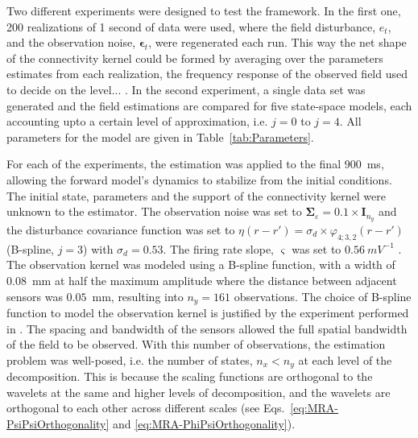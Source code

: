 \documentclass[review,authoryear,3p]{elsarticle}
\begin{document}
Two different experiments were designed to test the framework. In the first one, 200 realizations of 1 second of data were used, where the field disturbance, $e_t$, and the observation noise, $\boldsymbol\epsilon_t$, were regenerated each run. This way the net shape of the connectivity kernel could be formed by averaging over the parameters estimates from each realization, the frequency response of the observed field used to decide on the level... . In the second experiment, a single data set was generated and the field estimations are compared for five state-space models, each accounting upto a certain level of approximation, i.e. $j=0$ to $j=4$. All parameters for the model are given in Table~\ref{tab:Parameters}.

For each of the experiments, the estimation was applied to the final 900~ms, allowing the forward model's dynamics to stabilize from the initial conditions. The initial state, parameters and the support of the connectivity kernel were unknown to the estimator. The observation noise was set to $\boldsymbol\Sigma_{\varepsilon}=0.1 \times \mathbf{I}_{n_y}$ and the disturbance covariance function was set to $\eta(r-r') = \sigma_d\times\varphi_{4;3,2}(r-r')$ (B-spline, $j=3$) with $\sigma_d=0.53$.  The firing rate slope, $\varsigma$ was set to $0.56~mV^{-1}$ \citep{Wendling2005}. The observation kernel was modeled using a B-spline function, with a width of 0.08~mm at half the maximum amplitude where the distance between adjacent sensors was $0.05$~mm, resulting into $n_y = 161$ observations. The choice of B-spline function to model the observation kernel is justified by the experiment performed in \citep{Freestone2011}. The spacing and bandwidth of the sensors allowed the full spatial bandwidth of the field to be observed.  With this number of observations, the estimation problem was well-posed, i.e. the number of states, $n_x < n_y$ at each level of the decomposition. This is because the scaling functions are orthogonal to the wavelets at the same and higher levels of decomposition, and  the wavelets are orthogonal to each other across different scales (see Eqs.~\eqref{eq:MRA-PsiPsiOrthogonality} and \eqref{eq:MRA-PhiPsiOrthogonality}).
\end{document}
